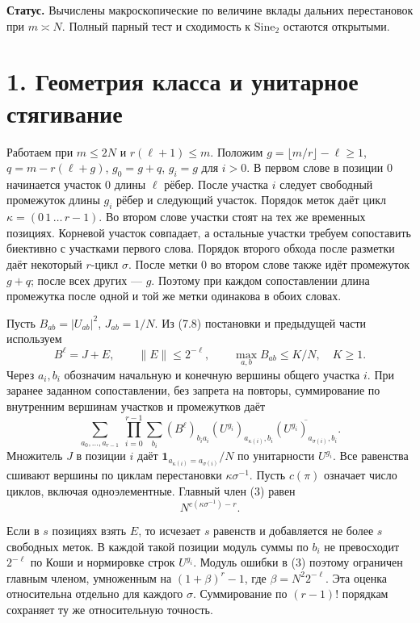 \documentclass[11pt,a4paper]{article}
\newcommand{\si}{\mathrm{Sine}_2}
\newcommand{\sect}[1]{\section*{\sffamily\color{ink}#1}}
\begin{document}
\textbf{Статус.} Вычислены макроскопические по величине вклады дальних перестановок при $m\asymp N$. Полный парный тест и сходимость к $\si$ остаются открытыми.
\newpage
\sect{1. Геометрия класса и унитарное стягивание}
Работаем при $m\le2N$ и $r(\ell+1)\le m$. Положим $g=\lfloor m/r\rfloor-\ell\ge1$, $q=m-r(\ell+g)$, $g_0=g+q$, $g_i=g$ для $i>0$. В первом слове в позиции 0 начинается участок 0 длины $\ell$ рёбер. После участка $i$ следует свободный промежуток длины $g_i$ рёбер и следующий участок. Порядок меток даёт цикл $\kappa=(0\,1\,\dots\,r-1)$. Во втором слове участки стоят на тех же временных позициях. Корневой участок совпадает, а остальные участки требуем сопоставить биективно с участками первого слова. Порядок второго обхода после разметки даёт некоторый $r$-цикл $\sigma$. После метки 0 во втором слове также идёт промежуток $g+q$; после всех других --- $g$. Поэтому при каждом сопоставлении длина промежутка после одной и той же метки одинакова в обоих словах.

Пусть $B_{ab}=|U_{ab}|^2$, $J_{ab}=1/N$. Из (7.8) постановки и предыдущей части используем
\[
       B^\ell=J+E,\qquad\|E\|\le2^{-\ell},\qquad
       \max_{a,b}B_{ab}\le K/N,\quad K\ge1.                           \tag{2}
\]
Через $a_i,b_i$ обозначим начальную и конечную вершины общего участка $i$. При заранее заданном сопоставлении, без запрета на повторы, суммирование по внутренним вершинам участков и промежутков даёт
\[
 \sum_{a_0,\ldots,a_{r-1}}\ \prod_{i=0}^{r-1}
          \sum_{b_i}
          (B^\ell)_{b_i a_i}
          (U^{g_i})_{a_{\kappa(i)},b_i}
           \overline{(U^{g_i})_{a_{\sigma(i)},b_i}} .                 \tag{3}
\]
Множитель $J$ в позиции $i$ даёт $\mathbf1_{a_{\kappa(i)}=a_{\sigma(i)}}/N$ по унитарности $U^{g_i}$. Все равенства сшивают вершины по циклам перестановки $\kappa\sigma^{-1}$. Пусть $c(\pi)$ означает число циклов, включая одноэлементные. Главный член (3) равен
\[
                             N^{c(\kappa\sigma^{-1})-r}.
                                                                     \tag{4}
\]

Если в $s$ позициях взять $E$, то исчезает $s$ равенств и добавляется не более $s$ свободных меток. В каждой такой позиции модуль суммы по $b_i$ не превосходит $2^{-\ell}$ по Коши и нормировке строк $U^{g_i}$. Модуль ошибки в (3) поэтому ограничен главным членом, умноженным на $(1+\beta)^r-1$, где $\beta=N^2 2^{-\ell}$. Эта оценка относительна отдельно для каждого $\sigma$. Суммирование по $(r-1)!$ порядкам сохраняет ту же относительную точность.
\end{document}
